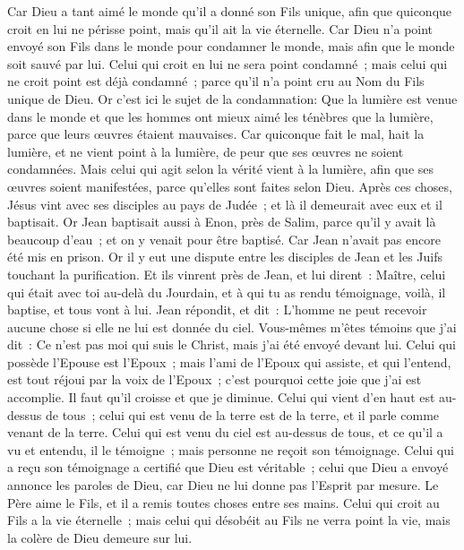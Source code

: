 \begin{multicols}{2}
Car Dieu a tant aimé le monde qu'il a donné son Fils unique, afin que quiconque croit en lui ne périsse point, mais qu'il ait la vie éternelle.
Car Dieu n'a point envoyé son Fils dans le monde pour condamner le monde, mais afin que le monde soit sauvé par lui.
Celui qui croit en lui ne sera point condamné~; mais celui qui ne croit point est déjà condamné~; parce qu'il n'a point cru au Nom du Fils unique de Dieu.
Or c'est ici le sujet de la condamnation: Que la lumière est venue dans le monde et que les hommes ont mieux aimé les ténèbres que la lumière, parce que leurs œuvres étaient mauvaises.
Car quiconque fait le mal, hait la lumière, et ne vient point à la lumière, de peur que ses œuvres ne soient condamnées.
Mais celui qui agit selon la vérité vient à la lumière, afin que ses œuvres soient manifestées, parce qu'elles sont faites selon Dieu.
Après ces choses, Jésus vint avec ses disciples au pays de Judée~; et là il demeurait avec eux et il baptisait.
Or Jean baptisait aussi à Enon, près de Salim, parce qu'il y avait là beaucoup d'eau~; et on y venait pour être baptisé.
Car Jean n'avait pas encore été mis en prison.
Or il y eut une dispute entre les disciples de Jean et les Juifs touchant la purification.
Et ils vinrent près de Jean, et lui dirent~: Maître, celui qui était avec toi au-delà du Jourdain, et à qui tu as rendu témoignage, voilà, il baptise, et tous vont à lui.
Jean répondit, et dit~: L'homme ne peut recevoir aucune chose si elle ne lui est donnée du ciel.
Vous-mêmes m'êtes témoins que j'ai dit~: Ce n'est pas moi qui suis le Christ, mais j'ai été envoyé devant lui.
Celui qui possède l'Epouse est l'Epoux~; mais l'ami de l'Epoux qui assiste, et qui l'entend, est tout réjoui par la voix de l'Epoux~; c'est pourquoi cette joie que j'ai est accomplie.
Il faut qu'il croisse et que je diminue.
Celui qui vient d'en haut est au-dessus de tous~; celui qui est venu de la terre est de la terre, et il parle comme venant de la terre. Celui qui est venu du ciel est au-dessus de tous,
et ce qu'il a vu et entendu, il le témoigne~; mais personne ne reçoit son témoignage.
Celui qui a reçu son témoignage a certifié que Dieu est véritable~;
celui que Dieu a envoyé annonce les paroles de Dieu, car Dieu ne lui donne pas l'Esprit par mesure.
Le Père aime le Fils, et il a remis toutes choses entre ses mains.
Celui qui croit au Fils a la vie éternelle~; mais celui qui désobéit au Fils ne verra point la vie, mais la colère de Dieu demeure sur lui.

\end{multicols}
